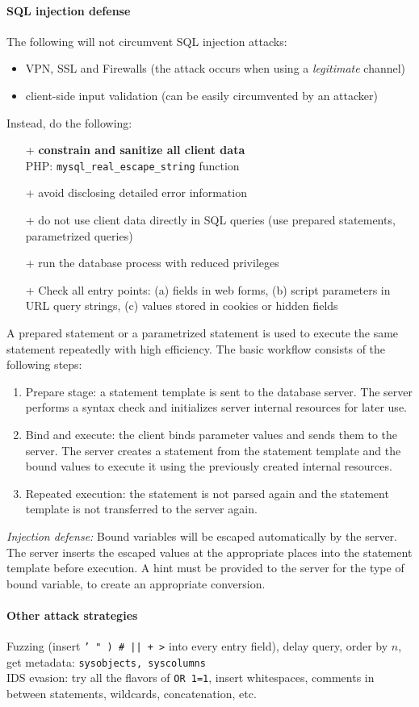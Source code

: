 \paragraph{SQL injection defense} The following will not circumvent SQL injection attacks:
\begin{itemize}
\item VPN, SSL and Firewalls (the attack occurs when using a \emph{legitimate} channel)
\item client-side input validation (can be easily circumvented by an attacker)
\end{itemize}
Instead, do the following:
\begin{itemize}
\item[+] \textbf{constrain and sanitize all client data}
\\ \quad PHP: {\tt mysql\_real\_escape\_string} function
\item[+] avoid disclosing detailed error information
\item[+] do not use client data directly in SQL queries (use prepared statements, parametrized queries)
\item[+] run the database process with reduced privileges
\item[+] Check all entry points: (a) fields in web forms, (b) script parameters in URL query strings, (c) values stored in cookies or hidden fields
\end{itemize}

 A prepared statement or a parametrized statement is used to execute the same statement repeatedly with high efficiency. The basic workflow consists of the following steps:

\begin{enumerate}
\item Prepare stage: a statement template is sent to the database server. The server performs a syntax check and initializes server internal resources for later use.
\item Bind and execute: the client binds parameter values and sends them to the server. The server creates a statement from the statement template and the bound values to execute it using the previously created internal resources.
\item Repeated execution: the statement is not parsed again and the statement template is not transferred to the server again.
\end{enumerate}

\textit{Injection defense:} Bound variables will be escaped automatically by the server. The server inserts the escaped values at the appropriate places into the statement template before execution. A hint must be provided to the server for the type of bound variable, to create an appropriate conversion.

\paragraph{Other attack strategies} Fuzzing (insert {\tt ' " ) # || + >} into every entry field), delay query, order by $n$, get metadata: {\tt sysobjects, syscolumns} \\
IDS evasion: try all the flavors of {\tt OR 1=1}, insert whitespaces, comments in between statements, wildcards, concatenation, etc.
